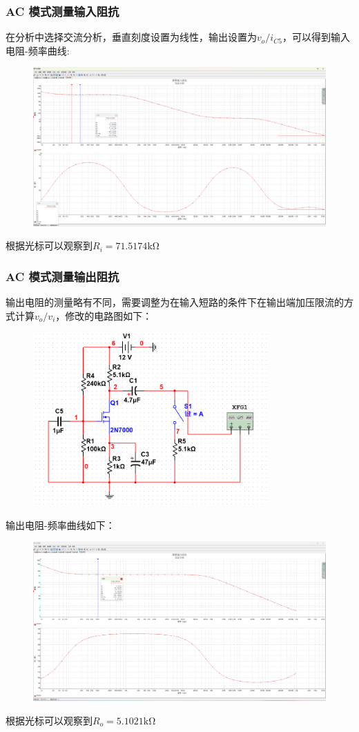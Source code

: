 \documentclass[a4paper,11pt,UTF8]{article}
\numberwithin{equation}{subsection}
\begin{document}
\subsubsection{AC 模式测量输入阻抗}
在分析中选择交流分析，垂直刻度设置为线性，输出设置为$v_o/i_{C5}$，可以得到输入电阻-频率曲线:
\begin{figure}[H]
	\centering
	\includegraphics[width=1\textwidth]{6.1.4_1.PNG}	
\end{figure}
根据光标可以观察到$R_i=71.5174\mathrm{k\Omega}$
\subsubsection{AC 模式测量输出阻抗}
输出电阻的测量略有不同，需要调整为在输入短路的条件下在输出端加压限流的方式计算$v_o/v_i$，修改的电路图如下：
\begin{figure}[H]
	\centering
	\includegraphics[width=0.8\textwidth]{6.1.5_1.PNG}	
\end{figure}
输出电阻-频率曲线如下：
\begin{figure}[H]
	\centering
	\includegraphics[width=1\textwidth]{6.1.5_2.PNG}	
\end{figure}
根据光标可以观察到$R_o=5.1021\mathrm{k\Omega}$
\end{document}
